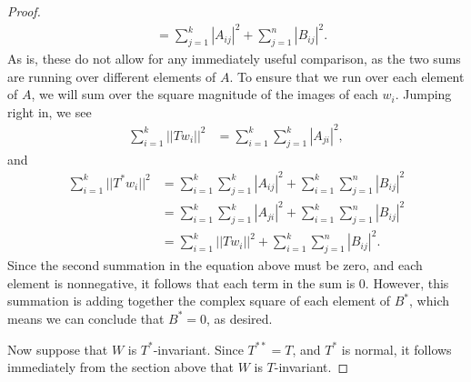 \documentclass[10pt,a4paper]{article}
\theoremstyle{definition}
\begin{document}
\begin{proof}
\begin{align*}
&= \sum_{j = 1}^k |A_{ij}|^2 + \sum_{j = 1}^n |B_{ij}|^2.
\end{align*}
As is, these do not allow for any immediately useful comparison, as the two sums are running over different elements of $A$. To ensure that we run over each element of $A$, we will sum over the square magnitude of the images of each $w_i$. Jumping right in, we see
\begin{align*}
\sum_{i=1}^k ||Tw_i||^2 &= \sum_{i=1}^k \sum_{j = 1}^k |A_{ji}|^2,
\end{align*}
and 
\begin{align*}
\sum_{i=1}^k ||T^*w_i||^2 &= \sum_{i=1}^k\sum_{j = 1}^k |A_{ij}|^2  + \sum_{i=1}^k \sum_{j = 1}^n |B_{ij}|^2 \\
&= \sum_{i=1}^k\sum_{j = 1}^k |A_{ji}|^2  + \sum_{i=1}^k \sum_{j = 1}^n |B_{ij}|^2 \\
&= \sum_{i=1}^k ||Tw_i||^2 + \sum_{i=1}^k \sum_{j = 1}^n |B_{ij}|^2.
\end{align*}
Since the second summation in the equation above must be zero, and each element is nonnegative, it follows that each term in the sum is 0. However, this summation is adding together the complex square of each element of $B^*$, which means we can conclude that $B^* = 0$, as desired.

Now suppose that $W$ is $T^*$-invariant. Since $T^{**} = T$, and $T^*$ is normal, it follows immediately from the section above that $W$ is $T$-invariant.
\end{proof}
\end{document}
